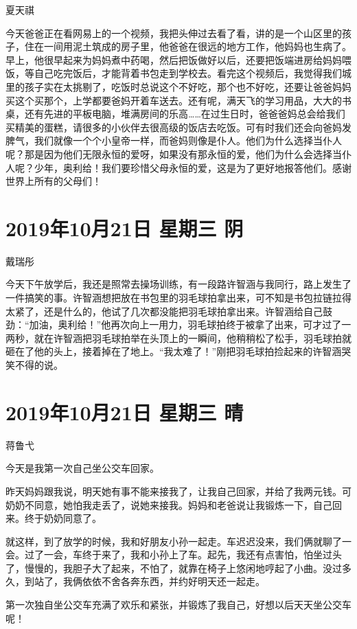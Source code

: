 夏天祺

今天爸爸正在看网易上的一个视频，我把头伸过去看了看，讲的是一个山区里的孩子，住在一间用泥土筑成的房子里，他爸爸在很远的地方工作，他妈妈也生病了。早上，他很早起来为妈妈煮中药喝，然后把饭做好以后，还要把饭端进房给妈妈喂饭，等自己吃完饭后，才能背着书包走到学校去。看完这个视频后，我觉得我们城里的孩子实在太挑剔了，吃饭时总说这个不好吃，那个也不好吃，还要让爸爸妈妈买这个买那个，上学都要爸妈开着车送去。还有呢，满天飞的学习用品，大大的书桌，还有先进的平板电脑，堆满房间的乐高\ldots\ldots 在过生日时，爸爸爸妈总会给我们买精美的蛋糕，请很多的小伙伴去很高级的饭店去吃饭。可有时我们还会向爸妈发脾气，我们就像一个个小皇帝一样，而爸妈则像是仆人。他们为什么选择当仆人呢？那是因为他们无限永恒的爱呀，如果没有那永恒的爱，他们为什么会选择当仆人呢？少年，奥利给！我们要珍惜父母永恒的爱，这是为了更好地报答他们。感谢世界上所有的父母们！

\section{2019年10月21日 星期三 阴}

戴瑞彤

今天下午放学后，我还是照常去操场训练，有一段路许智涵与我同行，路上发生了一件搞笑的事。许智涵想把放在书包里的羽毛球拍拿出来，可不知是书包拉链拉得太紧了，还是什么的，他试了几次都没能把羽毛球拍拿出来。许智涵给自己鼓劲：``加油，奥利给！''他再次向上一用力，羽毛球拍终于被拿了出来，可才过了一两秒，就在许智涵把羽毛球拍举在头顶上的一瞬间，他稍稍松了松手，羽毛球拍就砸在了他的头上，接着掉在了地上。``我太难了！''刚把羽毛球拍捡起来的许智涵哭笑不得的说。

\section{2019年10月21日 星期三 晴}

蒋鲁弋

今天是我第一次自己坐公交车回家。

昨天妈妈跟我说，明天她有事不能来接我了，让我自己回家，并给了我两元钱。可奶奶不同意，她怕我走丢了，说她来接我。妈妈和老爸说让我锻炼一下，自己回来。终于奶奶同意了。

就这样，到了放学的时候，我和好朋友小孙一起走。车迟迟没来，我们俩就聊了一会。过了一会，车终于来了，我和小孙上了车。起先，我还有点害怕，怕坐过头了，慢慢的，我胆子大了起来，不怕了，就靠在椅子上悠闲地哼起了小曲。没过多久，到站了，我俩依依不舍各奔东西，并约好明天还一起走。

第一次独自坐公交车充满了欢乐和紧张，并锻炼了我自己，好想以后天天坐公交车呢！

